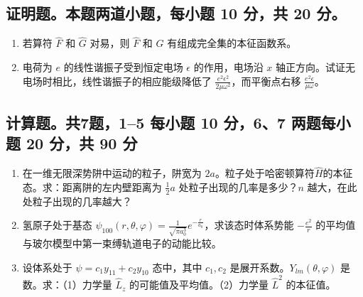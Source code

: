 \subsection{证明题。本题两道小题，每小题 10 分，共 20 分。}
\begin{enumerate}
    \item 若算符 $\hat{F}$ 和 $\hat{G}$ 对易，则 $\hat{F}$ 和 $\hat{G}$ 有组成完全集的本征函数系。
    \item 电荷为 $e$ 的线性谐振子受到恒定电场 $\epsilon$ 的作用，电场沿 $x$ 轴正方向。试证无电场时相比，线性谐振子的相应能级降低了 $\frac{e^2 \epsilon^2}{2\mu \omega^2}$，而平衡点右移 $\frac{e^2 \epsilon}{\mu \omega}$。
\end{enumerate}
\subsection{计算题。共7题，1--5 每小题 10 分，6、7 两题每小题 20 分，共 90 分}
\begin{enumerate}
    \item 在一维无限深势阱中运动的粒子，阱宽为 $2a$。粒子处于哈密顿算符$\hat H$的本征态。求：距离阱的左内壁距离为 $\frac{1}{2}a$ 处粒子出现的几率是多少？$n$ 越大，在此处粒子出现的几率越大？
    \item 氢原子处于基态 $\psi_{100} (r, \theta, \varphi) = \frac{1}{\sqrt{\pi a_0^3}} e^{- \frac{r}{a_0}}$，求该态时体系势能 $-\frac{e^2}{r}$ 的平均值与玻尔模型中第一束缚轨道电子的动能比较。
    \item 设体系处于 $\psi = c_1 y_{11} + c_2 y_{10}$ 态中，其中 $c_1, c_2$ 是展开系数。$Y_{lm}(\theta, \varphi)$ 是数。求：（1）力学量 $\hat L_z$ 的可能值及平均值。（2）力学量 $\hat L^2$ 的本征值。
\end{enumerate}